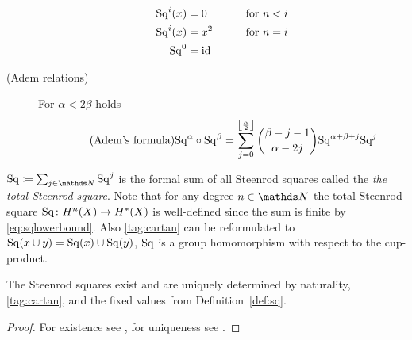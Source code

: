 \begin{Def}
\begin{description}
    \begin{alignat}{4}
      \mathrm{Sq}^{i}(x) &= 0     & \qquad\text{for }n<i \label{eq:sqlowerbound}\\
      \mathrm{Sq}^{i}(x) &= x^2   & \qquad\text{for }n=i \label{eq:sqsquared}\\
      \mathrm{Sq}^{0}    &= \mathrm{id}_{}   \label{eq:sqidentity}
    \end{alignat}
  \item[(Adem relations)] For $\alpha<2\beta$ holds
    \begin{gather}\label{tag:adem}\tag{Adem's formula}
      \mathrm{Sq}^{\alpha} \circ \mathrm{Sq}^{\beta} =
      \sum_{j=0}^{\left\lfloor \frac \alpha 2 \right\rfloor}
      \binom{\beta-j-1}{\alpha-2j}
      \mathrm{Sq}^{\alpha+\beta+j}\mathrm{Sq}^{j}
    \end{gather}
  \end{description}
  $\SQ\coloneqq \sum_{j\in\Nat}\Sq j$ is the formal sum of all
  Steenrod squares called the \emph{the total Steenrod square}.
  Note that for any degree $n\in\Nat$ the total Steenrod square
  $\mathrm{Sq}\colon H^n(X)\to H^*(X)$ is well-defined since the sum is
  finite by \eqref{eq:sqlowerbound}.
  Also \ref{tag:cartan} can be reformulated to
  $\mathrm{Sq}(x\cup y) = \mathrm{Sq}(x)\cup\mathrm{Sq}(y)$, \idest $\mathrm{Sq}$ is a group
  homomorphism with respect to the cup-product.
\end{Def}

\begin{Thm}
  The Steenrod squares exist and are uniquely determined by
  naturality, \ref{tag:cartan}, and the fixed values
  from Definition~\autoref{def:sq}.
  \begin{proof}
    For existence see \cite[Chapter 2]{mosher},
    for uniqueness see \cite[VIII §3]{steenrodepstein}.
  \end{proof}
\end{Thm}

